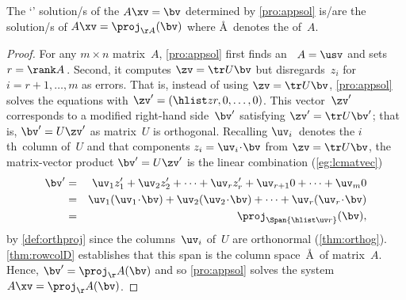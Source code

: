 \begin{theorem}[] \label{thm:lsqproj}
The `' solution/s of the  \(A\xv=\bv\) determined by \cref{pro:appsol} is/are the solution/s of \(A\xv=\proj_{\AA}(\bv)\) where \AA~denotes the  of~\(A\).
\end{theorem}

\begin{proof} 
For any \(m\times n\) matrix~\(A\), \cref{pro:appsol} first finds an \svd\ \(A=\usv\) and sets \(r=\rank A\)\,.
Second, it computes \(\zv=\tr U\bv\) but disregards~\(z_i\) for \(i=r+1,\ldots,m\) as errors.
That is, instead of using \(\zv=\tr U\bv\), \cref{pro:appsol} solves the equations with \(\zv'=(\hlist zr,0,\ldots,0)\). 
This vector~\(\zv'\) corresponds to a modified right-hand side~\(\bv'\) satisfying \(\zv'=\tr U\bv'\); that is, \(\bv'=U\zv'\) as matrix~\(U\) is orthogonal.
Recalling \(\uv_i\)~denotes the \(i\)th~column of~\(U\) and that components \(z_i=\uv_i\cdot\bv\) from  \(\zv=\tr U\bv\),
the matrix-vector product \(\bv'=U\zv'\) is the linear combination (\cref{eg:lcmatvec})
\begin{eqnarray*}
\bv'&=&\uv_1z'_1+\uv_2z'_2+\cdots+\uv_rz'_r+\uv_{r+1}0+\cdots+\uv_m0
\\&=&\uv_1(\uv_1\cdot\bv)+\uv_2(\uv_2\cdot\bv)+\cdots+\uv_r(\uv_r\cdot\bv)
\\&=&\proj_{\Span\{\hlist\uv r\}}(\bv),
\end{eqnarray*}
by \cref{def:orthproj} since the columns~\(\uv_i\) of~\(U\) are orthonormal (\cref{thm:orthog}).
\cref{thm:rowcolD} establishes that this span is the column space~\AA\ of matrix~\(A\).
Hence, \(\bv'=\proj_\AA(\bv)\) and so \cref{pro:appsol} solves the system \(A\xv=\proj_\AA(\bv)\).
\end{proof}


